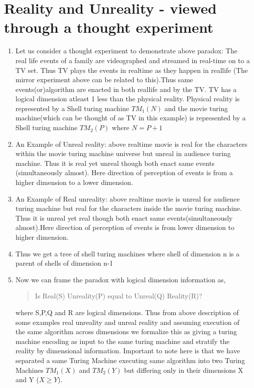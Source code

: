 \documentclass[11pt,onecolumn]{article}
\begin{document}
\section{Reality and Unreality - viewed through a thought experiment}
\begin{enumerate}
\item Let us consider a thought experiment to demonstrate above paradox:
The real life events of a family are videographed and streamed in real-time on to a TV set. Thus TV plays the events in realtime as they happen in reallife (The mirror experiment above can be related to this).Thus same events(or)algorithm are enacted in both reallife and by the TV. TV has a logical dimension atleast 1 less than the physical reality. Physical reality is represented by a Shell turing machine $TM_{1}(N)$ and the movie turing machine(which can be thought of as TV in this example) is represented by a Shell turing machine $TM_{2}(P)$ where $N=P+1$

\item An Example of Unreal reality: above realtime movie is real for the characters within the movie turing machine universe but unreal in audience turing machine. Thus it is real yet unreal though both enact same events (simultaneously almost). Here direction of perception of events is from a higher dimension to a lower dimension.

\item An Example of Real unreality: above realtime movie is unreal for audience turing machine but real for the characters inside the movie turing machine. Thus it is unreal yet real though both enact same events(simultaneously almost).Here direction of perception of events is from lower dimension to higher dimension.

\item Thus we get a tree of shell turing machines where shell of dimension n is a parent of shells of dimension n-1


\item Now we can frame the paradox with logical dimension information as,
\begin{quote}
Is Real(S) Unreality(P) equal to Unreal(Q) Reality(R)?
\end{quote}
where S,P,Q and R are logical dimensions. Thus from above description of some examples real unreality and unreal reality and assuming execution of the same algorithm across dimensions we formalize this as giving a turing machine encoding  as input to the same turing machine and stratify the reality by dimensional information. Important to note here is that we have separated a same Turing Machine executing same algorithm into two Turing Machines $TM_{1}(X)$ and $TM_{2}(Y)$ but differing only in their dimensions X and Y ($X \geq Y$).
\end{enumerate}
\end{document}
